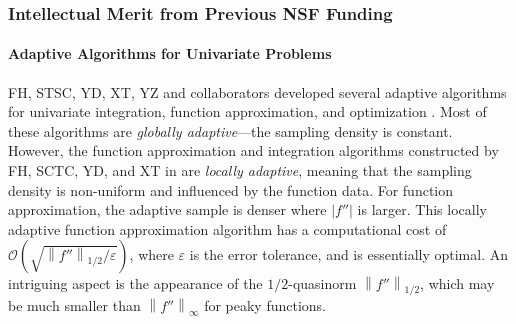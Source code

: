 \documentclass[11pt]{NSFamsart}
\def\abs#1{\ensuremath{\left \lvert #1 \right \rvert}}
\newcommand{\norm}[2][{}]{\ensuremath{\left \lVert #2 \right \rVert}_{#1}}
\newcommand{\Order}{\mathcal{O}}
\begin{document}
\subsubsection{Intellectual Merit from Previous NSF Funding}
\label{previousmeritsubsec}
\phantom{a}

\paragraph{Adaptive Algorithms for Univariate Problems} \label{sec:localadpat}
FH, STSC, YD, XT, YZ and collaborators developed several adaptive algorithms for univariate integration, function approximation, and optimization \cite{ChoEtal17a,HicEtal14b,  Din15a, Ton14a, Zha18a}.  Most of these algorithms are \emph{globally adaptive}---the sampling density is constant. However, the function approximation and integration algorithms constructed by FH, SCTC, YD, and XT in \cite{ChoEtal17a} are \emph{locally adaptive}, meaning that the sampling density is non-uniform and influenced by the function data.  For function approximation, the adaptive sample is denser where $\abs{f''}$ is larger.  This locally adaptive function approximation algorithm has a computational cost of $\Order\left(\sqrt{\norm[1/2]{f''}/\varepsilon} \right)$, where $\varepsilon$ is the error tolerance, and is essentially optimal.  An intriguing aspect is the appearance of the $1/2$-quasinorm $\norm[1/2]{f''}$, which may be much smaller than 
$\norm[\infty]{f''}$ for peaky functions.
\end{document}
